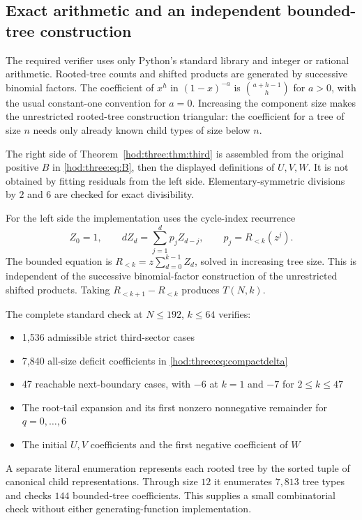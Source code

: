 \documentclass[11pt,letterpaper]{article}
\theoremstyle{definition}\newtheorem{definition}[theorem]{Definition}
\theoremstyle{remark}\newtheorem{remark}[theorem]{Remark}
\begin{document}
\subsection{Exact arithmetic and an independent bounded-tree construction}
The required verifier uses only Python's standard library and integer or rational arithmetic. Rooted-tree counts and shifted products are generated by successive binomial factors. The coefficient of $x^h$ in $(1-x)^{-a}$ is $\binom{a+h-1}{h}$ for $a>0$, with the usual constant-one convention for $a=0$. Increasing the component size makes the unrestricted rooted-tree construction triangular: the coefficient for a tree of size $n$ needs only already known child types of size below $n$.

The right side of Theorem~\ref{hod:three:thm:third} is assembled from the original positive $B$ in \eqref{hod:three:eq:B}, then the displayed definitions of $U,V,W$. It is not obtained by fitting residuals from the left side. Elementary-symmetric divisions by $2$ and $6$ are checked for exact divisibility.

For the left side the implementation uses the cycle-index recurrence
\begin{equation}\label{hod:three:eq:cyclerecurrence}
Z_0=1,\qquad dZ_d=\sum_{j=1}^d p_jZ_{d-j},\qquad p_j=R_{<k}(z^j).
\end{equation}
The bounded equation is $R_{<k}=z\sum_{d=0}^{k-1}Z_d$, solved in increasing tree size. This is independent of the successive binomial-factor construction of the unrestricted shifted products. Taking $R_{<k+1}-R_{<k}$ produces $T(N,k)$.

The complete standard check at $N\le192$, $k\le64$ verifies:
\begin{itemize}
\item 1,536 admissible strict third-sector cases
\item 7,840 all-size deficit coefficients in \eqref{hod:three:eq:compactdelta}
\item 47 reachable next-boundary cases, with $-6$ at $k=1$ and $-7$ for $2\le k\le47$
\item The root-tail expansion and its first nonzero nonnegative remainder for $q=0,\ldots,6$
\item The initial $U,V$ coefficients and the first negative coefficient of $W$
\end{itemize}
A separate literal enumeration represents each rooted tree by the sorted tuple of canonical child representations. Through size $12$ it enumerates $7,813$ tree types and checks $144$ bounded-tree coefficients. This supplies a small combinatorial check without either generating-function implementation.
\end{document}
